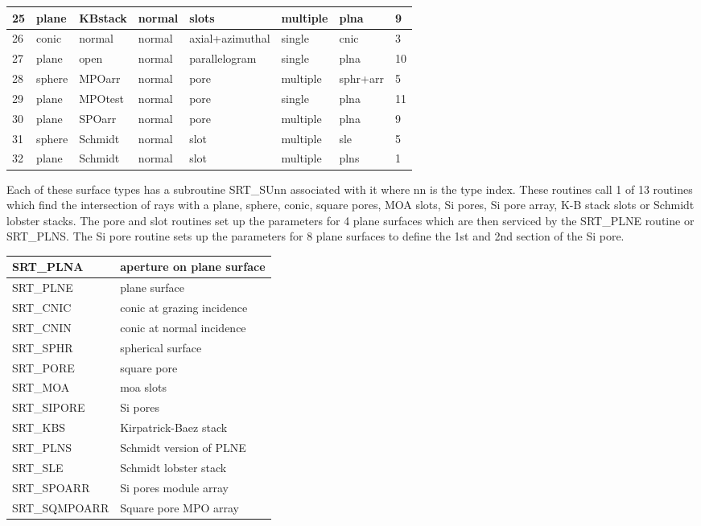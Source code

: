 \documentclass[letterpaper,10pt,english]{sphinxmanual}
\begin{document}
\begin{savenotes}
\begin{longtable}{|l|l|l|l|l|l|l|l|}
\hline
25
&
plane
&
KBstack
&
normal
&
slots
&
multiple
&
plna
&
9
\\
\hline
26
&
conic
&
normal
&
normal
&
axial+azimuthal
&
single
&
cnic
&
3
\\
\hline
27
&
plane
&
open
&
normal
&
parallelogram
&
single
&
plna
&
10
\\
\hline
28
&
sphere
&
MPOarr
&
normal
&
pore
&
multiple
&
sphr+arr
&
5
\\
\hline
29
&
plane
&
MPOtest
&
normal
&
pore
&
single
&
plna
&
11
\\
\hline
30
&
plane
&
SPOarr
&
normal
&
pore
&
multiple
&
plna
&
9
\\
\hline
31
&
sphere
&
Schmidt
&
normal
&
slot
&
multiple
&
sle
&
5
\\
\hline
32
&
plane
&
Schmidt
&
normal
&
slot
&
multiple
&
plns
&
1
\\
\hline
\end{longtable}\sphinxatlongtableend\end{savenotes}

Each of these surface types has a subroutine SRT\_SUnn associated with
it where nn is the type index. These routines call 1 of 13 routines which
find the intersection of rays with a plane, sphere, conic, square pores,
MOA slots, Si pores, Si pore array, K-B stack slots or Schmidt lobster stacks.
The pore and slot routines set up the parameters for 4 plane surfaces
which are then serviced by the SRT\_PLNE routine or SRT\_PLNS.
The Si pore routine
sets up the parameters for 8 plane surfaces to define the 1st and
2nd section of the Si pore.


\begin{savenotes}\sphinxattablestart
\centering
\begin{tabulary}{\linewidth}[t]{|T|T|}
\hline

SRT\_PLNA
&
aperture on plane surface
\\
\hline
SRT\_PLNE
&
plane surface
\\
\hline
SRT\_CNIC
&
conic at grazing incidence
\\
\hline
SRT\_CNIN
&
conic at normal incidence
\\
\hline
SRT\_SPHR
&
spherical surface
\\
\hline
SRT\_PORE
&
square pore
\\
\hline
SRT\_MOA
&
moa slots
\\
\hline
SRT\_SIPORE
&
Si pores
\\
\hline
SRT\_KBS
&
Kirpatrick-Baez stack
\\
\hline
SRT\_PLNS
&
Schmidt version of PLNE
\\
\hline
SRT\_SLE
&
Schmidt lobster stack
\\
\hline
SRT\_SPOARR
&
Si pores module array
\\
\hline
SRT\_SQMPOARR
&
Square pore MPO array
\\
\hline
\end{tabulary}
\par
\sphinxattableend\end{savenotes}
\end{document}
